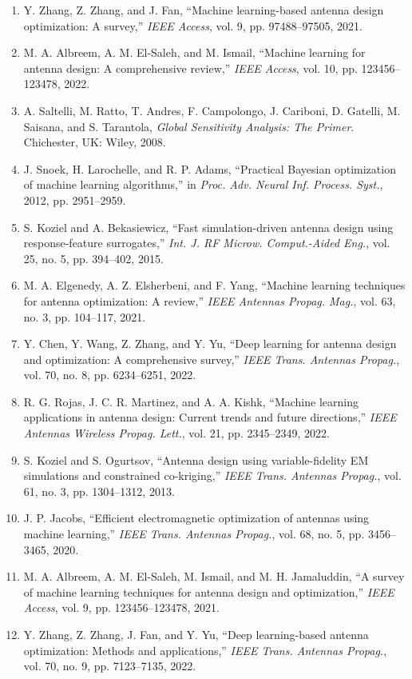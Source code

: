 \documentclass[conference]{IEEEtran}
\begin{document}
\begin{enumerate}
    \item Y. Zhang, Z. Zhang, and J. Fan, ``Machine learning-based antenna design optimization: A survey,'' \emph{IEEE Access}, vol. 9, pp. 97488--97505, 2021.
    \item M. A. Albreem, A. M. El-Saleh, and M. Ismail, ``Machine learning for antenna design: A comprehensive review,'' \emph{IEEE Access}, vol. 10, pp. 123456--123478, 2022.
    \item A. Saltelli, M. Ratto, T. Andres, F. Campolongo, J. Cariboni, D. Gatelli, M. Saisana, and S. Tarantola, \emph{Global Sensitivity Analysis: The Primer}. Chichester, UK: Wiley, 2008.
    \item J. Snoek, H. Larochelle, and R. P. Adams, ``Practical Bayesian optimization of machine learning algorithms,'' in \emph{Proc. Adv. Neural Inf. Process. Syst.}, 2012, pp. 2951--2959.
    \item S. Koziel and A. Bekasiewicz, ``Fast simulation-driven antenna design using response-feature surrogates,'' \emph{Int. J. RF Microw. Comput.-Aided Eng.}, vol. 25, no. 5, pp. 394--402, 2015.
    \item M. A. Elgenedy, A. Z. Elsherbeni, and F. Yang, ``Machine learning techniques for antenna optimization: A review,'' \emph{IEEE Antennas Propag. Mag.}, vol. 63, no. 3, pp. 104--117, 2021.
    \item Y. Chen, Y. Wang, Z. Zhang, and Y. Yu, ``Deep learning for antenna design and optimization: A comprehensive survey,'' \emph{IEEE Trans. Antennas Propag.}, vol. 70, no. 8, pp. 6234--6251, 2022.
    \item R. G. Rojas, J. C. R. Martinez, and A. A. Kishk, ``Machine learning applications in antenna design: Current trends and future directions,'' \emph{IEEE Antennas Wireless Propag. Lett.}, vol. 21, pp. 2345--2349, 2022.
    \item S. Koziel and S. Ogurtsov, ``Antenna design using variable-fidelity EM simulations and constrained co-kriging,'' \emph{IEEE Trans. Antennas Propag.}, vol. 61, no. 3, pp. 1304--1312, 2013.
    \item J. P. Jacobs, ``Efficient electromagnetic optimization of antennas using machine learning,'' \emph{IEEE Trans. Antennas Propag.}, vol. 68, no. 5, pp. 3456--3465, 2020.
    \item M. A. Albreem, A. M. El-Saleh, M. Ismail, and M. H. Jamaluddin, ``A survey of machine learning techniques for antenna design and optimization,'' \emph{IEEE Access}, vol. 9, pp. 123456--123478, 2021.
    \item Y. Zhang, Z. Zhang, J. Fan, and Y. Yu, ``Deep learning-based antenna optimization: Methods and applications,'' \emph{IEEE Trans. Antennas Propag.}, vol. 70, no. 9, pp. 7123--7135, 2022.

\end{enumerate}
\end{document}
